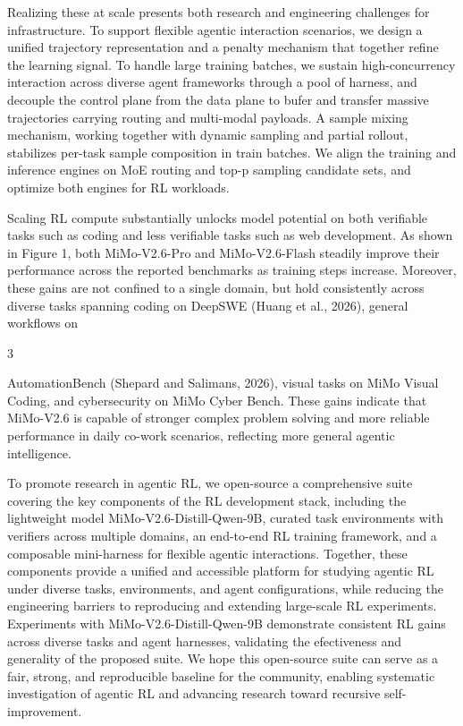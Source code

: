 \documentclass[
  10
]{article}
\begin{document}
Realizing these at scale presents both research and engineering
challenges for infrastructure. To support flexible agentic interaction
scenarios, we design a unified trajectory representation and a penalty
mechanism that together refine the learning signal. To handle large
training batches, we sustain high-concurrency interaction across diverse
agent frameworks through a pool of harness, and decouple the control
plane from the data plane to bufer and transfer massive trajectories
carrying routing and multi-modal payloads. A sample mixing mechanism,
working together with dynamic sampling and partial rollout, stabilizes
per-task sample composition in train batches. We align the training and
inference engines on MoE routing and top-p sampling candidate sets, and
optimize both engines for RL workloads.

Scaling RL compute substantially unlocks model potential on both
verifiable tasks such as coding and less verifiable tasks such as web
development. As shown in Figure 1, both MiMo-V2.6-Pro and
MiMo-V2.6-Flash steadily improve their performance across the reported
benchmarks as training steps increase. Moreover, these gains are not
confined to a single domain, but hold consistently across diverse tasks
spanning coding on DeepSWE (Huang et al., 2026), general workflows on

3

AutomationBench (Shepard and Salimans, 2026), visual tasks on MiMo
Visual Coding, and cybersecurity on MiMo Cyber Bench. These gains
indicate that MiMo-V2.6 is capable of stronger complex problem solving
and more reliable performance in daily co-work scenarios, reflecting
more general agentic intelligence.

To promote research in agentic RL, we open-source a comprehensive suite
covering the key components of the RL development stack, including the
lightweight model MiMo-V2.6-Distill-Qwen-9B, curated task environments
with verifiers across multiple domains, an end-to-end RL training
framework, and a composable mini-harness for flexible agentic
interactions. Together, these components provide a unified and
accessible platform for studying agentic RL under diverse tasks,
environments, and agent configurations, while reducing the engineering
barriers to reproducing and extending large-scale RL experiments.
Experiments with MiMo-V2.6-Distill-Qwen-9B demonstrate consistent RL
gains across diverse tasks and agent harnesses, validating the
efectiveness and generality of the proposed suite. We hope this
open-source suite can serve as a fair, strong, and reproducible baseline
for the community, enabling systematic investigation of agentic RL and
advancing research toward recursive self-improvement.
\end{document}
